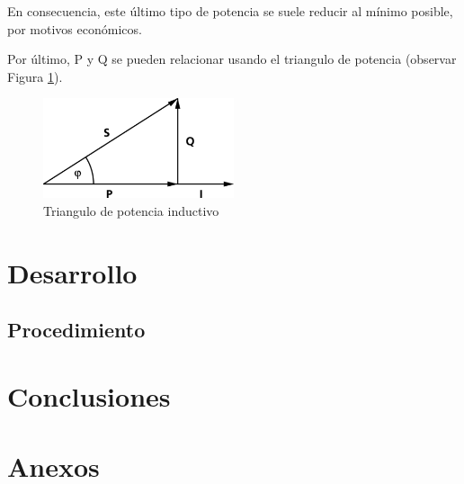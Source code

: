 \documentclass{article}
\begin{document}
        En consecuencia, este último tipo de potencia se suele reducir al mínimo posible, por motivos económicos.

        Por último, P y Q se pueden relacionar usando el triangulo de potencia (observar Figura \ref{fig:triangulo_de_potencia}). 
        \begin{figure}[h!] %
            \centering
            \includegraphics[width=0.5\textwidth]{Trojkat-mocy.png} %
            \caption{Triangulo de potencia inductivo}
            \label{fig:triangulo_de_potencia} %
        \end{figure}

    \indent
    \section{Desarrollo}

    \subsection{Procedimiento}
   
    \section{Conclusiones}

    \section{Anexos}
\end{document}
